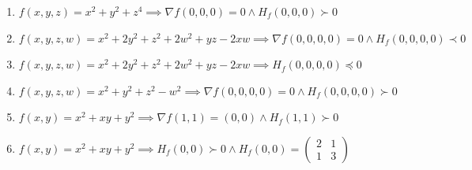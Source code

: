 \documentclass[11pt,a4paper]{article}
\begin{document}
\begin{enumerate}
\item $\displaystyle f(x, y, z) = x^{2} + y^{2} + z^{4} \implies \nabla f(0, 0, 0) = 0 \land H_{f}(0, 0, 0) \succ 0$
\item $\displaystyle f(x, y, z, w) = x^{2} + 2y^{2} + z^{2} + 2w^{2} + yz - 2xw \implies \nabla f(0, 0, 0, 0) = 0 \land H_{f}(0, 0, 0, 0) \prec 0$
\item $\displaystyle f(x, y, z, w) = x^{2} + 2y^{2} + z^{2} + 2w^{2} + yz - 2xw \implies H_{f}(0, 0, 0, 0) \preceq 0$
\item $\displaystyle f(x, y, z, w) = x^{2} + y^{2} + z^{2} - w^{2} \implies \nabla f(0, 0, 0, 0) = 0 \land H_{f}(0, 0, 0, 0) \succ 0$
\item $\displaystyle f(x, y) = x^{2} + xy + y^{2} \implies \nabla f(1, 1) = (0, 0) \land H_{f}(1, 1) \succ 0$
\item $\displaystyle f(x, y) = x^{2} + xy + y^{2} \implies H_{f}(0, 0) \succ 0 \land H_{f}(0, 0) = \begin{pmatrix} 2 & 1 \\ 1 & 3 \end{pmatrix}$
\end{enumerate}
\end{document}
